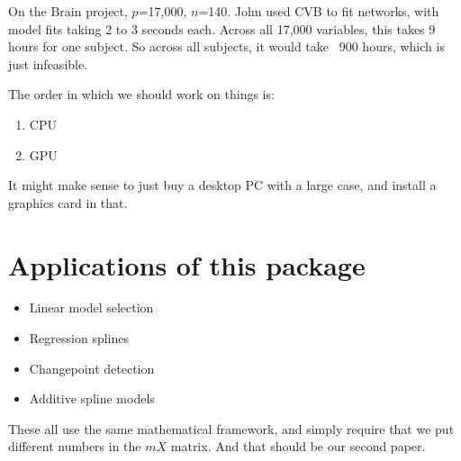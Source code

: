 \documentclass{amsart}
\begin{document}
On the Brain project, $p$=17,000, $n$=140. John used CVB to fit networks, with model fits taking 2 to 3
seconds each. Across all 17,000 variables, this takes 9 hours for one subject. So across all subjects, it
would take ~900 hours, which is just infeasible.

The order in which we should work on things is:
\begin{enumerate}
\item CPU
\item GPU
\end{enumerate}

It might make sense to just buy a desktop PC with a large case, and install a graphics card in that.

\section{Applications of this package}
\begin{itemize}
\item Linear model selection
\item Regression splines
\item Changepoint detection
\item Additive spline models
\end{itemize}

These all use the same mathematical framework, and simply require that we put different numbers in the $mX$
matrix. And that should be our second paper.
\end{document}
